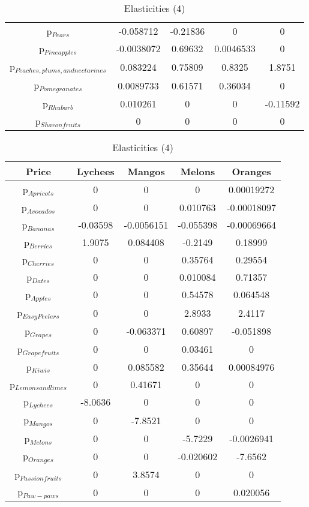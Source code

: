 \documentclass[11pt]{article}
\begin{document}
\begin{table}[h]
\begin{center}
\begin{table}[h]
\begin{center}
\begin{tabular}{ccccc}
p$_{Pears}$ & -0.058712 & -0.21836 & 0 & 0 \\ 
p$_{Pineapples}$ & -0.0038072 & 0.69632 & 0.0046533 & 0 \\ 
p$_{Peaches, plums, and nectarines}$ & 0.083224 & 0.75809 & 0.8325 & 1.8751 \\ 
p$_{Pomegranates}$ & 0.0089733 & 0.61571 & 0.36034 & 0 \\ 
p$_{Rhubarb}$ & 0.010261 & 0 & 0 & -0.11592 \\ 
p$_{Sharon fruits}$ & 0 & 0 & 0 & 0 \\ 
\end{tabular}
\end{center}
\end{table}
\begin{table}[h]
\caption{Elasticities (4)}
\label{Table: elasticities 4}
\begin{center}
\begin{tabular}{ccccc}
Price & Lychees & Mangos & Melons & Oranges \\ \hline
p$_{Apricots}$ & 0 & 0 & 0 & 0.00019272 \\ 
p$_{Avocados}$ & 0 & 0 & 0.010763 & -0.00018097 \\ 
p$_{Bananas}$ & -0.03598 & -0.0056151 & -0.055398 & -0.00069664 \\ 
p$_{Berries}$ & 1.9075 & 0.084408 & -0.2149 & 0.18999 \\ 
p$_{Cherries}$ & 0 & 0 & 0.35764 & 0.29554 \\ 
p$_{Dates}$ & 0 & 0 & 0.010084 & 0.71357 \\ 
p$_{Apples}$ & 0 & 0 & 0.54578 & 0.064548 \\ 
p$_{Easy Peelers}$ & 0 & 0 & 2.8933 & 2.4117 \\ 
p$_{Grapes}$ & 0 & -0.063371 & 0.60897 & -0.051898 \\ 
p$_{Grapefruits}$ & 0 & 0 & 0.03461 & 0 \\ 
p$_{Kiwis}$ & 0 & 0.085582 & 0.35644 & 0.00084976 \\ 
p$_{Lemons and limes}$ & 0 & 0.41671 & 0 & 0 \\ 
p$_{Lychees}$ & -8.0636 & 0 & 0 & 0 \\ 
p$_{Mangos}$ & 0 & -7.8521 & 0 & 0 \\ 
p$_{Melons}$ & 0 & 0 & -5.7229 & -0.0026941 \\ 
p$_{Oranges}$ & 0 & 0 & -0.020602 & -7.6562 \\ 
p$_{Passion fruits}$ & 0 & 3.8574 & 0 & 0 \\ 
p$_{Paw-paws}$ & 0 & 0 & 0 & 0.020056 \\ 

\end{tabular}
\end{center}
\end{table}
\end{center}
\end{table}
\end{document}
